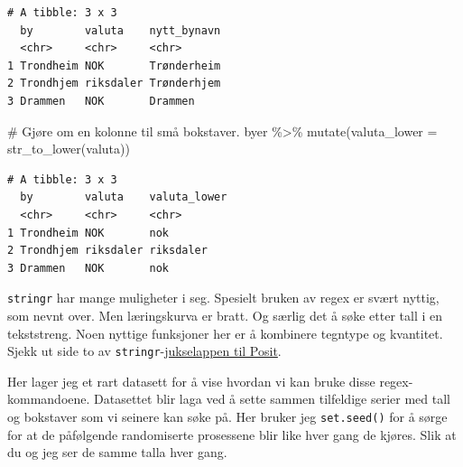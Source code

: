 \documentclass[
  letterpaper,
  DIV=11,
  numbers=noendperiod]{scrreprt}
\newenvironment{Shaded}{\begin{snugshade}}{\end{snugshade}}
\newcommand{\AttributeTok}[1]{\textcolor[rgb]{0.40,0.45,0.13}{#1}}
\newcommand{\CommentTok}[1]{\textcolor[rgb]{0.37,0.37,0.37}{#1}}
\newcommand{\FunctionTok}[1]{\textcolor[rgb]{0.28,0.35,0.67}{#1}}
\newcommand{\NormalTok}[1]{\textcolor[rgb]{0.00,0.23,0.31}{#1}}
\newcommand{\SpecialCharTok}[1]{\textcolor[rgb]{0.37,0.37,0.37}{#1}}
\begin{document}
\begin{verbatim}
# A tibble: 3 x 3
  by        valuta    nytt_bynavn
  <chr>     <chr>     <chr>      
1 Trondheim NOK       Trønderheim
2 Trondhjem riksdaler Trønderhjem
3 Drammen   NOK       Drammen    
\end{verbatim}

\begin{Shaded}
\begin{Highlighting}[]
\CommentTok{\# Gjøre om en kolonne til små bokstaver. }
\NormalTok{byer }\SpecialCharTok{\%\textgreater{}\%} 
  \FunctionTok{mutate}\NormalTok{(}\AttributeTok{valuta\_lower =} \FunctionTok{str\_to\_lower}\NormalTok{(valuta))}
\end{Highlighting}
\end{Shaded}

\begin{verbatim}
# A tibble: 3 x 3
  by        valuta    valuta_lower
  <chr>     <chr>     <chr>       
1 Trondheim NOK       nok         
2 Trondhjem riksdaler riksdaler   
3 Drammen   NOK       nok         
\end{verbatim}

\texttt{stringr} har mange muligheter i seg. Spesielt bruken av regex er
svært nyttig, som nevnt over. Men læringskurva er bratt. Og særlig det å
søke etter tall i en tekststreng. Noen nyttige funksjoner her er å
kombinere tegntype og kvantitet. Sjekk ut side to av
\texttt{stringr}-\href{https://posit.co/resources/cheatsheets/}{jukselappen
til Posit}.

Her lager jeg et rart datasett for å vise hvordan vi kan bruke disse
regex-kommandoene. Datasettet blir laga ved å sette sammen tilfeldige
serier med tall og bokstaver som vi seinere kan søke på. Her bruker jeg
\texttt{set.seed()} for å sørge for at de påfølgende randomiserte
prosessene blir like hver gang de kjøres. Slik at du og jeg ser de samme
talla hver gang.
\end{document}

